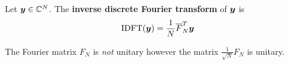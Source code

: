 \begin{definition}
Let $\boldsymbol{y} \in \mathbb{C}^N$. The {\bf inverse discrete Fourier transform} of $\boldsymbol{y}$ is
$$
\mathrm{IDFT}(\boldsymbol{y}) = \frac{1}{N} \overline{F}^T_N \boldsymbol{y}
$$
\end{definition}

\begin{note}
The Fourier matrix $F_N$ is {\it not} unitary however the matrix $\frac{1}{\sqrt{N}} F_N$ is unitary.
\end{note}
